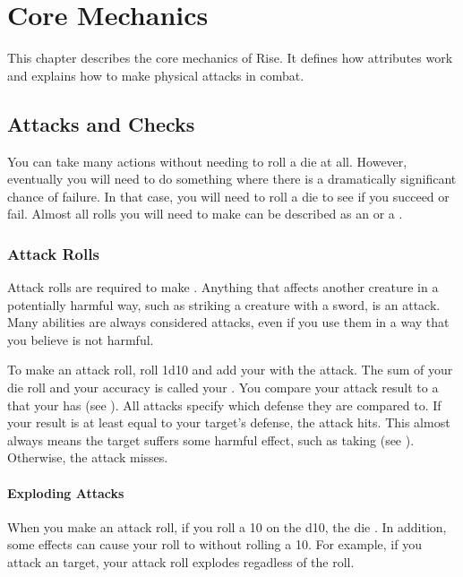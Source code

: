 \chapter{Core Mechanics}

This chapter describes the core mechanics of Rise.
It defines how attributes work and explains how to make physical attacks in combat.

\section{Attacks and Checks}\label{Attacks and Checks}
    You can take many actions without needing to roll a die at all.
    However, eventually you will need to do something where there is a dramatically significant chance of failure.
    In that case, you will need to roll a die to see if you succeed or fail.
    Almost all rolls you will need to make can be described as an  or a .

    \subsection{Attack Rolls}
        Attack rolls are required to make .
        Anything that affects another creature in a potentially harmful way, such as striking a creature with a sword, is an attack.
        Many abilities are always considered attacks, even if you use them in a way that you believe is not harmful.

        To make an attack roll, roll 1d10 and add your  with the attack.
        The sum of your die roll and your accuracy is called your .
        You compare your attack result to a  that your  has (see ).
        All attacks specify which defense they are compared to.
        If your result is at least equal to your target's defense, the attack hits.
        This almost always means the target suffers some harmful effect, such as taking  (see ).
        Otherwise, the attack misses.

        \subsubsection{Exploding Attacks}\label{Exploding Attacks}
            When you make an attack roll, if you roll a 10 on the d10, the die .
            In addition, some effects can cause your roll to  without rolling a 10.
            For example, if you attack an  target, your attack roll explodes regadless of the roll.


